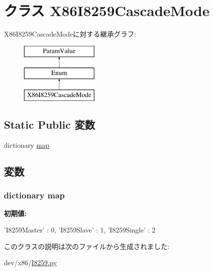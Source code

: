 \hypertarget{classI8259_1_1X86I8259CascadeMode}{
\section{クラス X86I8259CascadeMode}
\label{classI8259_1_1X86I8259CascadeMode}
}
X86I8259CascadeModeに対する継承グラフ:\begin{figure}[H]
\begin{center}
\leavevmode
\includegraphics[height=3cm]{classI8259_1_1X86I8259CascadeMode}
\end{center}
\end{figure}
\subsection*{Static Public 変数}
\begin{DoxyCompactItemize}
\item 
dictionary \hyperlink{classI8259_1_1X86I8259CascadeMode_aca70ca58dda85cf4fe7a0737ec18e004}{map}
\end{DoxyCompactItemize}


\subsection{変数}
\hypertarget{classI8259_1_1X86I8259CascadeMode_aca70ca58dda85cf4fe7a0737ec18e004}{
\subsubsection[{map}]{\setlength{\rightskip}{0pt plus 5cm}dictionary {\bf map}}}
\label{classI8259_1_1X86I8259CascadeMode_aca70ca58dda85cf4fe7a0737ec18e004}
{\bfseries 初期値:}
\begin{DoxyCode}
{'I8259Master' : 0,
           'I8259Slave' : 1,
           'I8259Single' : 2
    }
\end{DoxyCode}


このクラスの説明は次のファイルから生成されました:\begin{DoxyCompactItemize}
\item 
dev/x86/\hyperlink{I8259_8py}{I8259.py}\end{DoxyCompactItemize}
